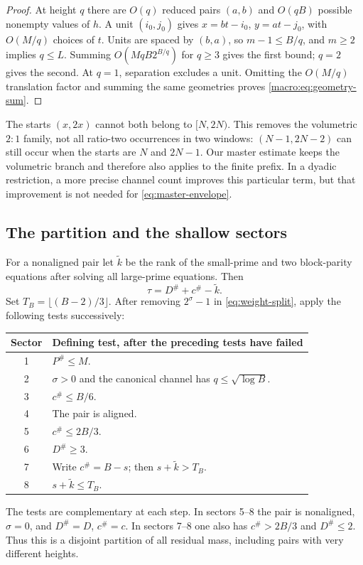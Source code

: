 \begin{proof}
At height $q$ there are $O(q)$ reduced pairs $(a,b)$ and $O(qB)$
possible nonempty values of $h$. A unit $(i_0,j_0)$ gives
$x=bt-i_0$, $y=at-j_0$, with $O(M/q)$ choices of $t$.
Units are spaced by $(b,a)$, so $m-1\le B/q$, and $m\ge2$ implies
$q\le L$. Summing $O(MqB2^{B/q})$ for $q\ge3$ gives the first bound;
$q=2$ gives the second. At $q=1$, separation excludes a unit.
Omitting the $O(M/q)$ translation factor and summing the same geometries
proves \eqref{macro:eq:geometry-sum}.
\end{proof}
\begin{remark}\label{rem:dyadic-edge}
The starts $(x,2x)$ cannot both belong to $[N,2N)$. This removes the
volumetric $2:1$ family, not all ratio-two occurrences in two windows:
$(N-1,2N-2)$ can still occur when the starts are $N$ and $2N-1$.
Our master estimate keeps the volumetric branch and therefore also applies
to the finite prefix. In a dyadic restriction, a more precise channel count
improves this particular term, but that improvement is not needed for
\eqref{eq:master-envelope}.
\end{remark}
\subsection{The partition and the shallow sectors}
For a nonaligned pair let $\widetilde k$ be the rank of the small-prime
and two block-parity equations after solving all large-prime equations.
Then
\begin{equation}\label{macro:lem:exact-rank}
 \tau=D^\#+c^\#-\widetilde k.
\end{equation}
Set $T_B=\lfloor(B-2)/3\rfloor$. After removing $2^\sigma-1$ in
\eqref{eq:weight-split}, apply the following tests successively:
\begin{center}\small
\begin{tabularx}{\textwidth}{@{}cX@{}}\toprule
Sector & Defining test, after the preceding tests have failed\\\midrule
1 & $P^\#\le M$.\\
2 & $\sigma>0$ and the canonical channel has $q\le\sqrt{\log B}$.\\
3 & $c^\#\le B/6$.\\
4 & The pair is aligned.\\
5 & $c^\#\le2B/3$.\\
6 & $D^\#\ge3$.\\
7 & Write $c^\#=B-s$; then $s+\widetilde k>T_B$.\\
8 & $s+\widetilde k\le T_B$.\\\bottomrule
\end{tabularx}
\end{center}
The tests are complementary at each step. In sectors 5--8 the pair is
nonaligned, $\sigma=0$, and $D^\#=D$, $c^\#=c$. In sectors 7--8 one
also has $c^\#>2B/3$ and $D^\#\le2$. Thus this is a disjoint partition
of all residual mass, including pairs with very different heights.

